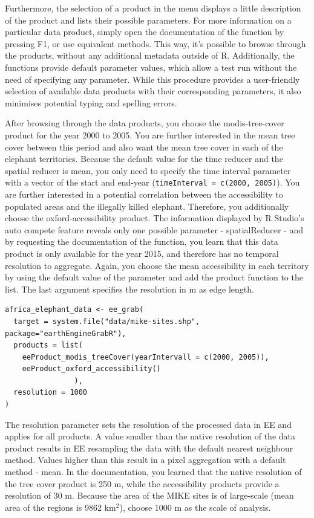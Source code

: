 Furthermore, the selection of a product in the menu displays a little description of the product and lists their possible parameters. For more information on a particular data product, simply open the documentation of the function by pressing F1, or use equivalent methods. This way, it's possible to browse through the products, without any additional metadata outside of R. Additionally, the functions provide default parameter values, which allow a test run without the need of specifying any parameter. While this procedure provides a user-friendly selection of available data products with their corresponding parameters, it also minimises potential typing and spelling errors.

After browsing through the data products, you choose the modis-tree-cover product for the year 2000 to 2005. You are further interested in the mean tree cover between this period and also want the mean tree cover in each of the elephant territories. Because the default value for the time reducer and the spatial reducer is mean, you only need to specify the time interval parameter with a vector of the start and end-year (\texttt{timeInterval = c(2000, 2005)}). You are further interested in a potential correlation between the accessibility to populated areas and the illegally killed elephant. Therefore, you additionally choose the oxford-accessibility product. The information displayed by R Studio's auto compete feature reveals only one possible parameter - spatialReducer - and by requesting the documentation of the function, you learn that this data product is only available for the year 2015, and therefore has no temporal resolution to aggregate. Again, you choose the mean accessibility in each territory by using the default value of the parameter and add the product function to the list. The last argument specifies the resolution in m as edge length. 


\begin{lstlisting}
africa_elephant_data <- ee_grab(
  target = system.file("data/mike-sites.shp", package="earthEngineGrabR"),
  products = list(
    eeProduct_modis_treeCover(yearIntervall = c(2000, 2005)),
    eeProduct_oxford_accessibility()
                ),
  resolution = 1000
)

\end{lstlisting}

The resolution parameter sets the resolution of the processed data in EE and applies for all products. A value smaller than the native resolution of the data product results in EE resampling the data with the default nearest neighbour method. Values higher than this result in a pixel aggregation with a default method - mean. In the documentation, you learned that the native resolution of the tree cover product is 250 m, while the accessibility products provide a resolution of 30 m. Because the area of the MIKE sites is of large-scale (mean area of the regions is 9862 km$^2$), choose 1000 m as the scale of analysis. 



